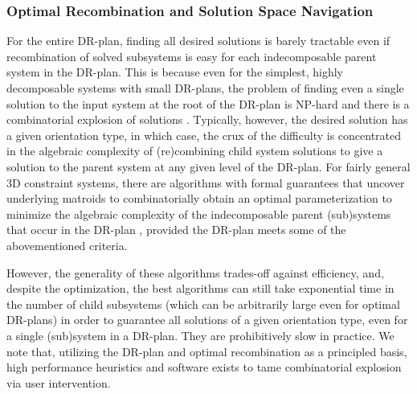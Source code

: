 \subsubsection{Optimal Recombination and Solution Space Navigation}
For the entire DR-plan, finding all desired solutions is barely tractable even if recombination of solved subsystems is easy for each indecomposable parent system in the DR-plan. This is because even for the simplest, highly decomposable systems with small DR-plans, the problem of finding even a single solution to the input system at the root of the DR-plan is NP-hard  \cite{saxe1979embeddability} and there is a combinatorial explosion of solutions \cite{borcea2004number}. Typically, however, the desired solution has a given orientation type, in which case, the crux of the difficulty is concentrated in the algebraic complexity of (re)combining child system solutions to give a solution to the parent system at any given level of the DR-plan. For fairly general 3D constraint systems, there are algorithms with formal guarantees that uncover underlying matroids to combinatorially obtain an optimal parameterization to minimize the algebraic complexity of the indecomposable parent (sub)systems that occur in the DR-plan \cite{sitharam2010optimized,sitharam2006well,sitharam2010reconciling}, provided the DR-plan meets some of the abovementioned criteria.

However, the generality of these algorithms trades-off against efficiency, and, despite the optimization, the best algorithms can still take exponential time in the number of child subsystems (which can be arbitrarily large even for optimal DR-plans) in order to guarantee all solutions of a given orientation type, even for a single (sub)system in a DR-plan. They are prohibitively slow in practice. We note that, utilizing the DR-plan and optimal recombination as a principled basis, high performance heuristics and software exists \cite{sitharam2006solution} to tame combinatorial explosion via user intervention.

